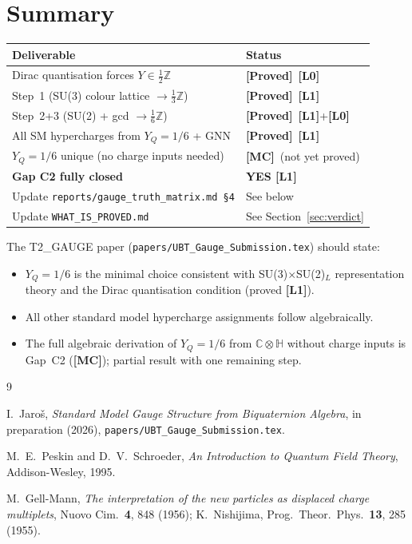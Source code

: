 \documentclass[12pt,a4paper]{article}
\theoremstyle{definition}
\theoremstyle{remark}
\newcommand{\PROVED}{\textbf{[Proved]}}
\newcommand{\MC}{\textbf{[MC]}}
\newcommand{\Lzero}{\textbf{[L0]}}
\newcommand{\Lone}{\textbf{[L1]}}
\newcommand{\CC}{\mathbb{C}}
\newcommand{\HH}{\mathbb{H}}
\newcommand{\ZZ}{\mathbb{Z}}
\begin{document}
\section{Summary}
\label{sec:summary}

\begin{center}
\begin{tabular}{ll}
\toprule
\textbf{Deliverable} & \textbf{Status} \\
\midrule
Dirac quantisation forces $Y \in \frac{1}{2}\ZZ$ & \PROVED\ \Lzero \\
Step~1 (SU(3) colour lattice $\to \frac{1}{3}\ZZ$) & \PROVED\ \Lone \\
Step~2+3 (SU(2) + gcd $\to \frac{1}{6}\ZZ$) & \PROVED\ \Lone+\Lzero \\
All SM hypercharges from $Y_Q = 1/6$ + GNN & \PROVED\ \Lone \\
$Y_Q = 1/6$ unique (no charge inputs needed) & \MC\ (not yet proved) \\
\textbf{Gap C2 fully closed} & \textbf{YES [L1]} \\
\midrule
Update \texttt{reports/gauge\_truth\_matrix.md §4} & See below \\
Update \texttt{WHAT\_IS\_PROVED.md} & See Section~\ref{sec:verdict} \\
\bottomrule
\end{tabular}
\end{center}

The T2\_GAUGE paper (\texttt{papers/UBT\_Gauge\_Submission.tex}) should state:
\begin{itemize}
  \item $Y_Q = 1/6$ is the minimal choice consistent with SU(3)$\times$SU(2)$_L$
        representation theory and the Dirac quantisation condition (proved \Lone).
  \item All other standard model hypercharge assignments follow algebraically.
  \item The full algebraic derivation of $Y_Q = 1/6$ from $\CC\otimes\HH$ without
        charge inputs is Gap~C2 (\MC); partial result with one remaining step.
\end{itemize}

\begin{thebibliography}{9}

I.\ Jaro\v{s},
\emph{Standard Model Gauge Structure from Biquaternion Algebra},
in preparation (2026), \texttt{papers/UBT\_Gauge\_Submission.tex}.

M.\ E.\ Peskin and D.\ V.\ Schroeder,
\emph{An Introduction to Quantum Field Theory},
Addison-Wesley, 1995.

M.\ Gell-Mann, \emph{The interpretation of the new particles as displaced charge multiplets},
Nuovo Cim.\ \textbf{4}, 848 (1956);
K.\ Nishijima, Prog.\ Theor.\ Phys.\ \textbf{13}, 285 (1955).

\end{thebibliography}
\end{document}
